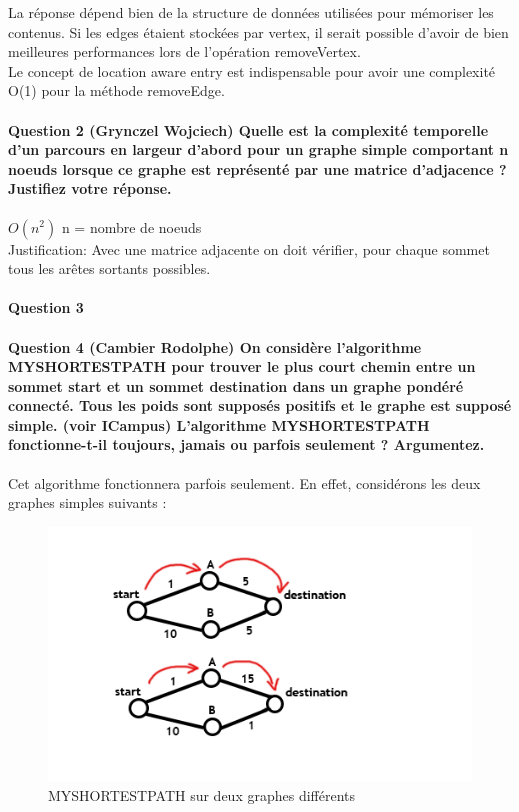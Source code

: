 \documentclass[a4paper]{article}
\begin{document}
La réponse dépend bien de la structure de données utilisées pour mémoriser les contenus. Si les edges étaient stockées par vertex, il serait possible d'avoir de bien meilleures performances lors de l'opération removeVertex.\\

Le concept de location aware entry est indispensable pour avoir une complexité O(1) pour la méthode removeEdge.

\paragraph{Question 2 (Grynczel Wojciech) Quelle est la complexité temporelle d’un parcours en largeur d’abord pour un	graphe simple comportant n noeuds lorsque ce graphe est représenté par une matrice d’adjacence ? Justifiez votre réponse.\\}

$ O(n^2) $ 	n = nombre de noeuds\\
Justification: Avec une matrice adjacente on doit vérifier, pour chaque sommet  tous les arêtes sortants possibles.


\paragraph{Question 3}

\paragraph{Question 4 (Cambier Rodolphe) On considère l’algorithme MYSHORTESTPATH pour trouver le plus court chemin
entre un sommet start et un sommet destination dans un graphe pondéré
connecté. Tous les poids sont supposés positifs et le graphe est supposé simple. (voir ICampus) 
L’algorithme MYSHORTESTPATH fonctionne-t-il toujours, jamais ou parfois seulement
? Argumentez.} Cet algorithme fonctionnera parfois seulement. En effet, considérons les deux graphes simples suivants :

\begin{figure}[H]
\centering
\includegraphics[scale=0.5]{graphs}
\caption{MYSHORTESTPATH sur deux graphes différents}
\end{figure} 
\end{document}
